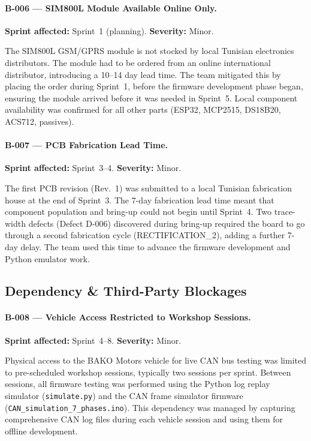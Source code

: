 \paragraph{B-006 --- SIM800L Module Available Online Only.}
\textbf{Sprint affected:} Sprint~1 (planning). \textbf{Severity:} Minor.

The SIM800L GSM/GPRS module is not stocked by local Tunisian electronics distributors. The module had to be ordered from an online international distributor, introducing a 10--14 day lead time. The team mitigated this by placing the order during Sprint~1, before the firmware development phase began, ensuring the module arrived before it was needed in Sprint~5. Local component availability was confirmed for all other parts (ESP32, MCP2515, DS18B20, ACS712, passives).

\paragraph{B-007 --- PCB Fabrication Lead Time.}
\textbf{Sprint affected:} Sprint~3--4. \textbf{Severity:} Minor.

The first PCB revision (Rev.~1) was submitted to a local Tunisian fabrication house at the end of Sprint~3. The 7-day fabrication lead time meant that component population and bring-up could not begin until Sprint~4. Two trace-width defects (Defect D-006) discovered during bring-up required the board to go through a second fabrication cycle (RECTIFICATION\_2), adding a further 7-day delay. The team used this time to advance the firmware development and Python emulator work.

\subsection{Dependency \& Third-Party Blockages}

\paragraph{B-008 --- Vehicle Access Restricted to Workshop Sessions.}
\textbf{Sprint affected:} Sprint~4--8. \textbf{Severity:} Minor.

Physical access to the BAKO Motors vehicle for live CAN bus testing was limited to pre-scheduled workshop sessions, typically two sessions per sprint. Between sessions, all firmware testing was performed using the Python log replay simulator (\texttt{simulate.py}) and the CAN frame simulator firmware (\texttt{CAN\_simulation\_7\_phases.ino}). This dependency was managed by capturing comprehensive CAN log files during each vehicle session and using them for offline development.

